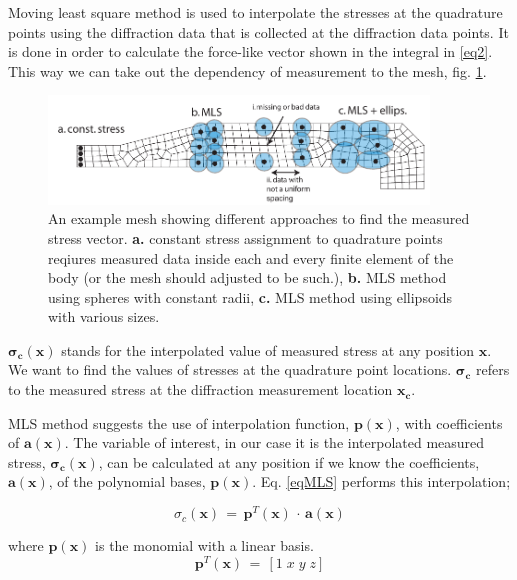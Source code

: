 \documentclass{article}
\begin{document}
Moving least square method is used to interpolate the stresses at the quadrature points using the diffraction data that is collected at the diffraction data points. It is done in order to calculate the force-like vector shown in the integral in \eqref{eq2}. This way we can take out the dependency of measurement to the mesh, fig. \ref{figMLS}.

\begin{figure}[!ht]
    \centering
            \includegraphics[width=0.9\textwidth]{examplemesh.pdf}
    \caption{An example mesh showing different approaches to find the measured stress vector. \textbf{a.} constant stress assignment to quadrature points reqiures measured data inside each and every finite element of the body (or the mesh should adjusted to be such.), \textbf{b.} MLS method using spheres with constant radii, \textbf{c.} MLS method using ellipsoids with various sizes. }
    \label{figMLS}
\end{figure}


$\mathbf{\sigma_c(x)}$ stands for the interpolated value of measured stress at any position $\mathbf{x}$. We want to find the values of stresses at the quadrature point locations. $\mathbf{\sigma_c}$ refers to the measured stress at the diffraction measurement location $\mathbf{x_c}$. 


MLS method suggests the use of interpolation function, $\mathbf{p}(\mathbf{x})$, with coefficients of $\mathbf{a(x)}$. The variable of interest, in our case it is the interpolated measured stress, $\mathbf{\sigma_c(x)}$, can be calculated at any position if we know the coefficients, $\mathbf{a(x)}$, of the polynomial bases, $\mathbf{p}(\mathbf{x})$. Eq. \eqref{eqMLS} performs this interpolation;

\begin{equation}
\sigma_c(\mathbf{x})\,= \, \mathbf{p}^T(\mathbf{x}) \,\cdot\,\mathbf{a}(\mathbf{x})
\label{eqMLS}
\end{equation}

where $\mathbf{p}(\mathbf{x})$ is the monomial with a linear basis. 
\begin{equation}
\mathbf{p}^T(\mathbf{x})\,= \, [1\; x\; y\; z]
\end{equation}
\end{document}
